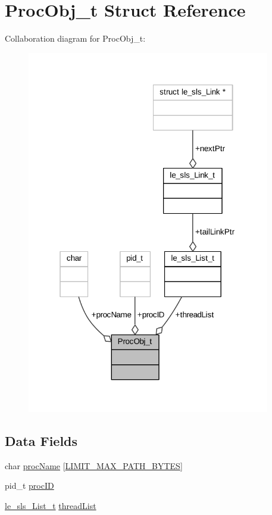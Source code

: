 \hypertarget{struct_proc_obj__t}{}\section{Proc\+Obj\+\_\+t Struct Reference}
\label{struct_proc_obj__t}


Collaboration diagram for Proc\+Obj\+\_\+t\+:
\nopagebreak
\begin{figure}[H]
\begin{center}
\leavevmode
\includegraphics[width=301pt]{struct_proc_obj__t__coll__graph}
\end{center}
\end{figure}
\subsection*{Data Fields}
\begin{DoxyCompactItemize}
\item 
char \hyperlink{struct_proc_obj__t_a3d77e32b6b4c5c132399f022abf006e1}{proc\+Name} \mbox{[}\hyperlink{limit_8h_accd19a6264ef965c02f113dc01610e14}{L\+I\+M\+I\+T\+\_\+\+M\+A\+X\+\_\+\+P\+A\+T\+H\+\_\+\+B\+Y\+T\+ES}\mbox{]}
\item 
pid\+\_\+t \hyperlink{struct_proc_obj__t_a1e7495204a8ef803e847c261b76ae972}{proc\+ID}
\item 
\hyperlink{structle__sls___list__t}{le\+\_\+sls\+\_\+\+List\+\_\+t} \hyperlink{struct_proc_obj__t_a244afe61f947732dbf553ad90c9fe83b}{thread\+List}
\end{DoxyCompactItemize}


